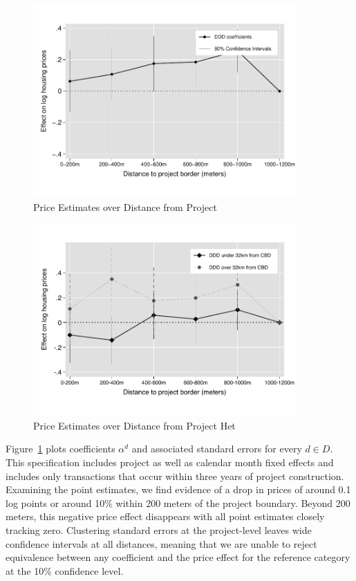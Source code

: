\documentclass[12pt]{article}
\begin{document}
\begin{figure}[b!]
\caption{Price Estimates over Distance from Project}\label{figure:distplot}
\centering
\includegraphics[width=0.9\textwidth,trim={0cm .7cm 0cm 0.7cm},clip=true]{figures/price_regs_DDDplot}
\vspace{-2mm}
\end{figure}

\begin{figure}[b!]
\caption{Price Estimates over Distance from Project Het}\label{figure:distplot_het}
\centering
\includegraphics[width=0.9\textwidth,trim={0cm .7cm 0cm 0.7cm},clip=true]{figures/price_regs_DDDplot_het}
\vspace{-2mm}
\end{figure}


Figure~\ref{figure:distplot} plots coefficients $\alpha^d$ and associated standard errors for every $d\in D$. This specification includes project as well as calendar month fixed effects and includes only transactions that occur within three years of project construction.  Examining the point estimates, we find evidence of a drop in prices of around 0.1 log points or around 10\% within 200 meters of the project boundary.  Beyond 200 meters, this negative price effect disappears with all point estimates closely tracking zero.  Clustering standard errors at the project-level leaves wide confidence intervals at all distances, meaning that we are unable to reject equivalence between any coefficient and the price effect for the reference category at the 10\% confidence level.
\end{document}
